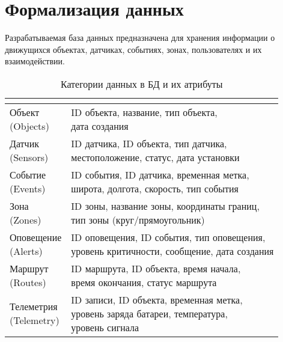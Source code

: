 \clearpage

\section{Формализация данных}

Разрабатываемая база данных предназначена для хранения информации о движущихся объектах, датчиках, событиях, зонах, пользователях и их взаимодействии.

\begin{table}[H]
	\centering
	\caption{Категории данных в БД и их атрибуты}
	\label{tbl:sensortrack_data}
	\begin{tabular}{|l|l|}
		\hline
		\textbf{\makecell{Категория}} & \textbf{\makecell{Атрибуты}} \\ \hline
		
		\makecell{Объект \\ (Objects)}         & \makecell{ID объекта, название, тип объекта, \\ дата создания} \\ \hline
		\makecell{Датчик \\ (Sensors)}         & \makecell{ID датчика, ID объекта, тип датчика, \\ местоположение, статус, дата установки} \\ \hline
		\makecell{Событие \\ (Events)}         & \makecell{ID события, ID датчика, временная метка, \\ широта, долгота, скорость, тип события} \\ \hline
		\makecell{Зона \\ (Zones)}             & \makecell{ID зоны, название зоны, координаты границ, \\ тип зоны (круг/прямоугольник)} \\ \hline
		\makecell{Оповещение \\ (Alerts)}      & \makecell{ID оповещения, ID события, тип оповещения, \\ уровень критичности, сообщение, дата создания} \\ \hline
		\makecell{Маршрут \\ (Routes)}         & \makecell{ID маршрута, ID объекта, время начала, \\ время окончания, статус маршрута} \\ \hline
		\makecell{Телеметрия \\ (Telemetry)}   & \makecell{ID записи, ID объекта, временная метка, \\ уровень заряда батареи, температура, \\ уровень сигнала} \\ \hline

\end{tabular}
\end{table}
